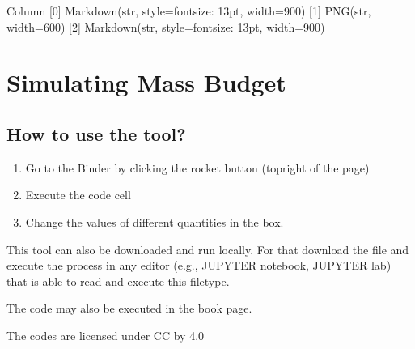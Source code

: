 \documentclass[letterpaper,10pt,english]{sphinxmanual}
\begin{document}
\begin{sphinxVerbatim}[commandchars=\\\{\}]
Column
    [0] Markdown(str, style=\PYGZob{}\PYGZsq{}font\PYGZhy{}size\PYGZsq{}: \PYGZsq{}13pt\PYGZsq{}\PYGZcb{}, width=900)
    [1] PNG(str, width=600)
    [2] Markdown(str, style=\PYGZob{}\PYGZsq{}font\PYGZhy{}size\PYGZsq{}: \PYGZsq{}13pt\PYGZsq{}\PYGZcb{}, width=900)
\end{sphinxVerbatim}


\section{Simulating Mass Budget}
\label{\detokenize{contents/tools/decay:simulating-mass-budget}}\label{\detokenize{contents/tools/decay::doc}}


\subsection{How to use the tool?}
\label{\detokenize{contents/tools/decay:how-to-use-the-tool}}\begin{enumerate}
%
\item {} 
Go to the Binder by clicking the rocket button (top\sphinxhyphen{}right of the page)

\item {} 
Execute the code cell

\item {} 
Change the values of different quantities in the box.

\end{enumerate}

This tool can also be downloaded and run locally. For that download the  file and execute the process in any editor (e.g., JUPYTER notebook, JUPYTER lab) that is able to read and execute this file\sphinxhyphen{}type.

The code may also be executed in the book page.

The codes are licensed under CC by 4.0 
\end{document}
